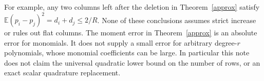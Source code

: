 \documentclass[11pt]{article}
\newcommand{\E}{\mathbb E}
\begin{document}
For example, any two columns left after the deletion in Theorem~\ref{approx} satisfy
$\E(p_i-p_j)^2=d_i+d_j\le2/R$. None of these conclusions assumes
strict increase or rules out flat columns. The moment error in
Theorem~\ref{approx} is an absolute error for monomials. It does not
supply a small error for arbitrary degree-$r$ polynomials, whose
monomial coefficients can be large. In particular this note does not
claim the universal quadratic lower bound on the number of rows, or
an exact scalar quadrature replacement.
\end{document}
